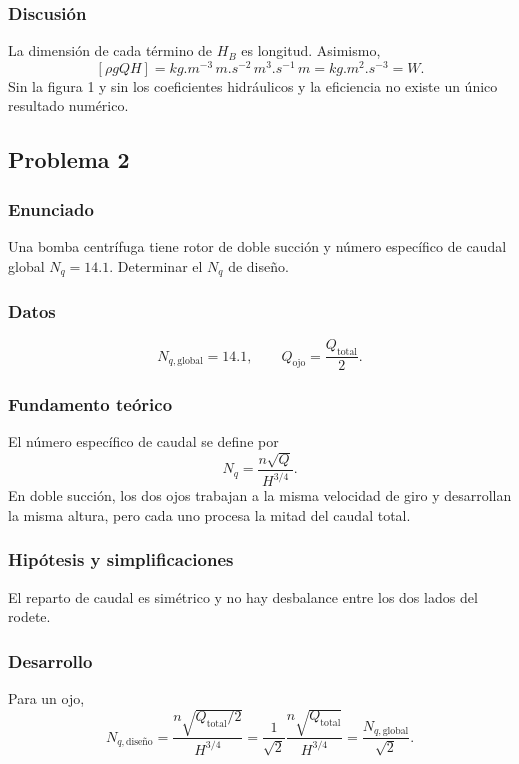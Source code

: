 \documentclass[12pt]{article}
\begin{document}
\subsubsection*{Discusión}
La dimensión de cada término de $H_B$ es longitud. Asimismo,
\[
[\rho gQH]
=\si{kg.m^{-3}}\,\si{m.s^{-2}}\,\si{m^3.s^{-1}}\,\si{m}
=\si{kg.m^2.s^{-3}}=\si{W}.
\]
Sin la figura 1 y sin los coeficientes hidráulicos y la
eficiencia no existe un único resultado numérico.

\subsection{Problema 2}

\subsubsection*{Enunciado}
Una bomba centrífuga tiene rotor de doble succión y número específico de caudal global
$N_q=14.1$. Determinar el $N_q$ de diseño.

\subsubsection*{Datos}
\[
N_{q,\mathrm{global}}=14.1,\qquad Q_{\mathrm{ojo}}=\frac{Q_{\mathrm{total}}}{2}.
\]

\subsubsection*{Fundamento teórico}
El número específico de caudal se define por
\[
N_q=\frac{n\sqrt{Q}}{H^{3/4}}.
\]
En doble succión, los dos ojos trabajan a la misma velocidad de giro y desarrollan la misma
altura, pero cada uno procesa la mitad del caudal total.

\subsubsection*{Hipótesis y simplificaciones}
El reparto de caudal es simétrico y no hay desbalance entre los dos lados del rodete.

\subsubsection*{Desarrollo}
Para un ojo,
\[
N_{q,\text{diseño}}
=\frac{n\sqrt{Q_{\mathrm{total}}/2}}{H^{3/4}}
=\frac{1}{\sqrt{2}}\frac{n\sqrt{Q_{\mathrm{total}}}}{H^{3/4}}
=\frac{N_{q,\mathrm{global}}}{\sqrt{2}}.
\]
\end{document}
